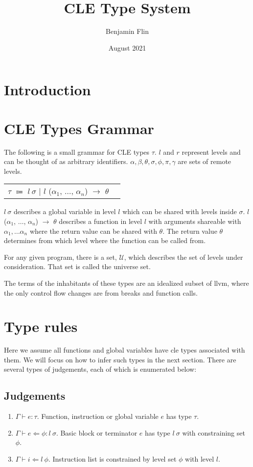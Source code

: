 \documentclass{article}
\title{CLE Type System}
\author{Benjamin Flin}
\date{August 2021}
\begin{document}
\maketitle

\section{Introduction}
\section{CLE Types Grammar}
The following is a small grammar for CLE types $\tau$. 
$l$ and $r$ represent levels and can be thought of as arbitrary identifiers.
$\alpha, \beta, \theta, \sigma, \phi, \pi, \gamma$ are sets of remote levels. 
\begin{center}
\begin{tabular}{ l r }
    $\tau$ $\Coloneqq$ $l\ \sigma$ $\bigl\vert$ $l$ ($\alpha_1$, $\dots$, $\alpha_n$) $\rightarrow$ $\theta$ \\
\end{tabular}
\end{center}

$l\ \sigma$ describes a global variable in level $l$ which can be shared with levels inside $\sigma$. 
$l$ ($\alpha_1$, $\dots$, $\alpha_n$) $\rightarrow$ $\theta$ describes a function in level $l$ with arguments shareable with $\alpha_1, \ldots \alpha_n$ where the return
value can be shared with $\theta$. The return value $\theta$ determines from which level where the function can be called from.

For any given program, there is a set, $\mathcal{U}$, which describes the set of levels under consideration.
That set is called the universe set.

The terms of the inhabitants of these types are an idealized subset of llvm, where the only control flow changes are from
breaks and function calls. 

\section{Type rules}
Here we assume all functions and global variables have cle types associated with them.  We will focus on how to infer such types in the next section.
There are several types of judgements, each of which is enumerated below:

\subsection{Judgements}
\begin{enumerate}
    \item $\Gamma \vdash e : \tau$. 
    Function, instruction or global variable $e$ has type $\tau$. 
    \item $\Gamma \vdash e \Leftarrow \phi: l\ \sigma$. 
    Basic block or terminator $e$ has type $l\ \sigma$ with constraining set $\phi$. 
    \item $\Gamma \vdash i \Leftarrow l\ \phi$. 
    Instruction list is constrained by level set $\phi$ with level $l$.

\end{enumerate}
\end{document}
